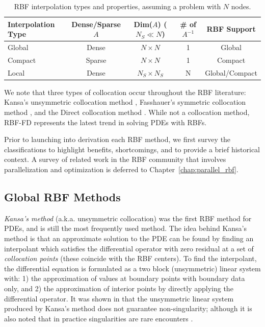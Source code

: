 \documentclass{report}
\begin{document}
{\begin{table}[t]
   \centering
   \begin{tabular}{E | C | C | C | c | } %
   Interpolation Type & Dense/Sparse $A$ & Dim($A$) ($N_S \ll N$) &  \# of $A^{-1}$  & RBF Support \\ 
   \hline \hline
   Global & Dense & $N \times N$ & 1 & Global \\
   Compact & Sparse & $N \times N$ & 1 & Compact \\
   Local & Dense & $N_S \times N_S$ & N & Global/Compact
   \end{tabular}
   \caption{RBF interpolation types and properties, assuming a problem with $N$ nodes.}
   \label{tbl:interp_types}
\end{table}


We note that three types of collocation occur throughout the RBF literature: 
Kansa's unsymmetric collocation method \cite{Kansa1990a, Kansa1990b}, Fasshauer's symmetric collocation method \cite
{Fasshauer1997}, and the Direct collocation method \cite{Fedoseyev2002}. While not a collocation method, RBF-FD represents the latest trend in solving PDEs with RBFs.  %

Prior to launching into derivation each RBF method, we first survey the classifications to highlight benefits, shortcomings, and to provide a brief historical context. A survey of related work in the RBF community that involves parallelization and optimization is deferred to Chapter~\ref{chap:parallel_rbf}. 

\subsection{Global RBF Methods}

\emph{Kansa's method} \cite{Kansa1990a, Kansa1990b} (a.k.a. unsymmetric collocation) was the first RBF method for PDEs, and is still the most frequently used method. The idea behind Kansa's method is that an 
approximate solution to the PDE can be found by finding an interpolant which satisfies the differential operator with zero residual at a set of \emph{collocation points} (these coincide with the RBF centers). To find the interpolant, the differential equation is formulated as a two block (unsymmetric) linear system with: 1) the approximation of values 
at boundary 
points with boundary data only, and 2) the approximation of interior points by directly applying the differential operator. It was 
shown in \cite{Fasshauer1997, Hon2001} that the unsymmetric linear system produced by Kansa's method does not guarantee 
non-singularity; although it is also noted that in practice singularities are rare encounters \cite{Larsson2003}. 

}
\end{document}
